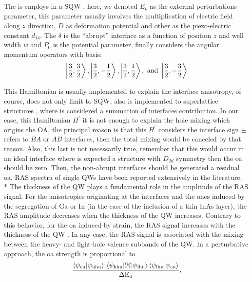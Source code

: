 The  is employs in a \gls{SQW} \cite{chen2002interface}, here, we denoted $E_{p}$ as the external perturbations parameter, this parameter usually involves the multiplication of electric field along $z$ direction, $D$ as deformation potential and other as the piezo-electric constant $d_{14}$. The $\delta$  is the ``abrupt'' interface as a function of position $z$ and well width $w$ and $P_{0}$ is the potential parameter, finally considers the angular momentum operators with basis\cite{chen2002interface}:  
\begin{equation}\label{eqn:chapter-2-sec-anisotropy-model-jotas-basis}
	\ket{\dfrac{3}{2},\dfrac{3}{2}},\ket{\dfrac{3}{2},-\dfrac{1}{2}},\ket{\dfrac{3}{2},\dfrac{1}{2}},\text{ and } \ket{\dfrac{3}{2},-\dfrac{3}{2}}
\end{equation}

This Hamiltonian is usually implemented to explain the interface anisotropy, of course, does not only limit to \gls{SQW}, also is implemented to superlattice structures \cite{ye2001inplane}, where is considered a summation of interfaces contribution.  In our case, this Hamiltonian $H^{\prime}$ it is not enough to explain the hole mixing which origins the OA, the principal reason is that this  $H^{\prime}$ considers the interface sign $\pm$ refers to $BA$ or $AB$ interfaces, then the total mixing would be canceled by that reason. Also, this last is not necessarily true, remember that this would occur in an ideal interface where is expected a structure with $D_{2d}$ symmetry then the \gls{oa} should be zero. Then, the non-abrupt interfaces should be generated a residual \gls{oa}\cite{li2019quantitative,krebs1998inversion,chen2002interface}. \gls{RAS} spectra of single QWs have been reported extensively in the literature\cite{chen2002interface,koopmans1998microscopic,tang2009well-width,li2019quantitative,yu2015tuning}. \\*
The thickness of the \gls{QW} plays a fundamental role in the amplitude of the \gls{RAS} signal. For the anisotropies originating at the interfaces and the ones induced by the segregation of Ga or In (in the case of the inclusion of a thin InAs layer), the \gls{RAS} amplitude decreases when the thickness of the \gls{QW}
increases\cite{chen2002interface}. Contrary to this behavior, for the \gls{oa} induced by strain, the \gls{RAS} signal increases with the thickness of the
\gls{QW} \cite{tang2009well-width}. In any case, the \gls{RAS} signal is associated with the mixing between the heavy- and light-hole valence subbands
of the \gls{QW}\cite{ivchenko1996heavylight}. In a perturbative approach, the \gls{oa} strength is proportional to
\begin{equation}\label{eqn:chapter-2-sec-anisotropy-model-perturbative}
	\dfrac{
		   \braket{\psi_{\mathrm{en}}} {\psi_{\mathrm{hhn}}}
		   \mel{\psi_{\mathrm{hhn}}}{\cal{H}}{\psi_{\mathrm{lhn}}}
		   \braket{\psi_{\mathrm{lhn}}} {\psi_{\mathrm{en}}}
		  }
		  {\mathrm{\Delta E_{n}}
		  },
\end{equation}

